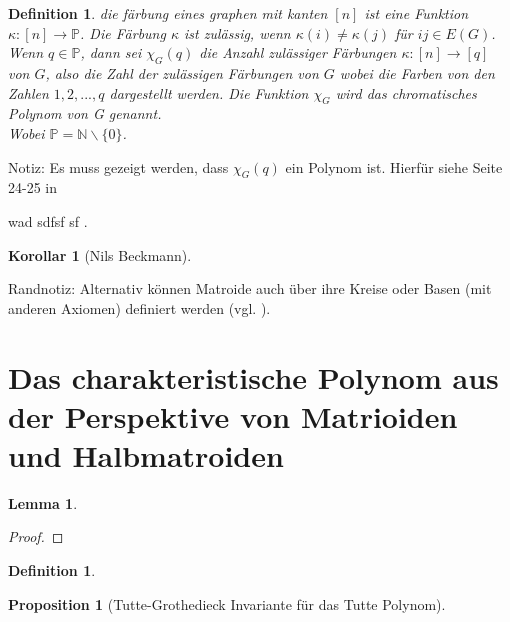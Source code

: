 \documentclass[12pt]{article}%
\theoremstyle{examplestyle}
\theoremstyle{examplestyle}
\theoremstyle{examplestyle}
\newtheorem{lem}[theo]{Lemma}%
\theoremstyle{examplestyle}
\newtheorem{kor}[theo]{Korollar}%
\theoremstyle{examplestyle}
\newtheorem{prop}[theo]{Proposition}%
\theoremstyle{examplestyle}
\newtheorem{defi}[theo]{Definition}%
\begin{document}
  
\begin{defi} die färbung eines graphen mit kanten $[n]$ ist eine Funktion $\kappa: [n]\to \mathbb{P} $. Die Färbung $\kappa$ ist zulässig,
  wenn $\kappa(i) \neq \kappa(j)$ für $ij \in E(G)$. Wenn $q\in \mathbb{P}$, dann sei $\chi_G(q)$ die Anzahl zulässiger Färbungen $\kappa: [n]\to [q] $ von $G$, also die Zahl der zulässigen Färbungen von $G$ wobei die Farben von den Zahlen  $1,2,...,q$ dargestellt werden.
  Die Funktion $\chi_G$ wird das chromatisches Polynom von G genannt.\\
  Wobei $\mathbb{P}=\mathbb{N}\backslash \{0\}$.%
\end{defi}

Notiz: Es muss gezeigt werden, dass $\chi_G(q)$ ein Polynom ist. Hierfür siehe Seite 24-25 in \cite{stan}


wad sdfsf sf .
\begin{kor}[Nils Beckmann]

  
\end{kor}











 Randnotiz: Alternativ können Matroide auch über ihre Kreise oder Basen (mit anderen Axiomen) definiert werden (vgl. \cite{MatBuch}).

\section{Das charakteristische Polynom aus der Perspektive von Matrioiden und Halbmatroiden}


\begin{lem}\label{C-e=C/e}
 
\end{lem}
\begin{proof}

\end{proof}





\begin{defi}
  
\end{defi}


\begin{prop}[Tutte-Grothedieck Invariante für das Tutte Polynom]\label{T-GInv}
 
\end{prop}
\end{document}
